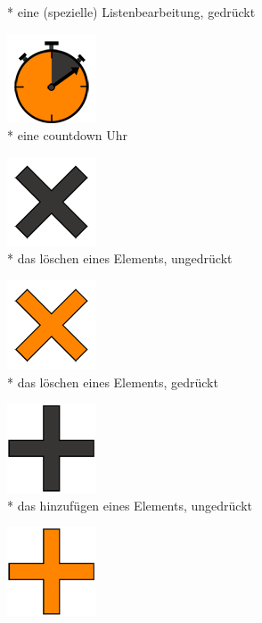 \documentclass[FIPLY_base.tex]{subfiles}
\begin{document}
\begin{figure}[H]
\begin{subfigure}[b]{0.2\textwidth}
			\caption{* eine (spezielle) Listenbearbeitung, gedrückt}
		\end{subfigure}
		\hfil
		\begin{subfigure}[b]{0.2\textwidth}
			\includegraphics[scale=0.5]{img/icons/countdown}
			\caption{* eine countdown Uhr}
		\end{subfigure}
		\hfil
		\begin{subfigure}[b]{0.2\textwidth}
			\includegraphics[scale=0.5]{img/icons/minusgreysmall}
			\caption{* das löschen eines Elements, ungedrückt}
		\end{subfigure}
		\hfil
		\begin{subfigure}[b]{0.2\textwidth}
			\includegraphics[scale=0.5]{img/icons/minusorangesmall}
			\caption{* das löschen eines Elements, gedrückt}
		\end{subfigure}
		\hfil
		\begin{subfigure}[b]{0.2\textwidth}
			\includegraphics[scale=0.5]{img/icons/plusgreysmall}
			\caption{* das hinzufügen eines Elements, ungedrückt}
		\end{subfigure}
		\hfil
		\begin{subfigure}[b]{0.2\textwidth}
			\includegraphics[scale=0.5]{img/icons/plusorangesmall}

\end{subfigure}
\end{figure}
\end{document}
